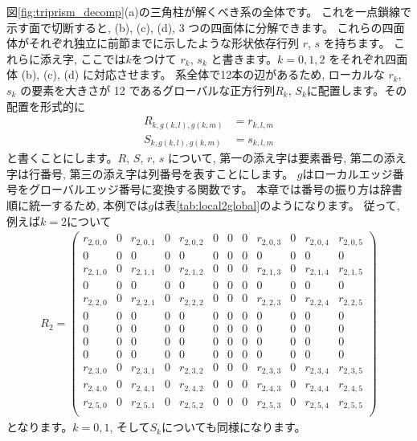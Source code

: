 図\ref{fig:triprism_decomp}(a)の三角柱が解くべき系の全体です。
これを一点鎖線で示す面で切断すると, (b), (c), (d), 3 つの四面体に分解できます。
これらの四面体がそれぞれ独立に前節までに示したような形状依存行列 $r$, $s$
を持ちます。
これらに添え字, ここでは$k$をつけて $r_k$, $s_k$
と書きます。$k=0, 1, 2$ をそれぞれ四面体 (b), (c), (d) に対応させます。
系全体で12本の辺があるため, ローカルな $r_k$, $s_k$ の要素を大きさが 12
であるグローバルな正方行列$R_k$, $S_k$に配置します。その配置を形式的に
\begin{align}
R_{k,g(k, l),g(k, m)} &= r_{k,l,m}\\
S_{k,g(k, l),g(k, m)} &= s_{k,l,m}
\end{align}
と書くことにします。$R$, $S$, $r$, $s$
について, 第一の添え字は要素番号, 第二の添え字は行番号,
第三の添え字は列番号を表すことにします。
$g$はローカルエッジ番号をグローバルエッジ番号に変換する関数です。
本章では番号の振り方は辞書順に統一するため,
本例では$g$は表\ref{tab:local2global}のようになります。
従って, 例えば$k=2$について
\begin{align}
R_2=
\left(
\begin{array}{ccccc|ccccc|cc}
r_{2,0,0} & 0 & r_{2,0,1} & 0 & r_{2,0,2} & 0 & 0 & 0 & r_{2,0,3} & 0 & r_{2,0,4} & r_{2,0,5}\\
0 & 0 & 0 & 0 & 0 &  0 & 0 & 0 & 0 & 0 &  0 & 0 \\
r_{2,1,0} & 0 & r_{2,1,1} & 0 & r_{2,1,2} & 0 & 0 & 0 & r_{2,1,3} & 0 & r_{2,1,4} & r_{2,1,5}\\
0 & 0 & 0 & 0 & 0 &  0 & 0 & 0 & 0 & 0 &  0 & 0 \\
r_{2,2,0} & 0 & r_{2,2,1} & 0 & r_{2,2,2} & 0 & 0 & 0 & r_{2,2,3} & 0 & r_{2,2,4} & r_{2,2,5}\\
\hline
0 & 0 & 0 & 0 & 0 &  0 & 0 & 0 & 0 & 0 &  0 & 0 \\
0 & 0 & 0 & 0 & 0 &  0 & 0 & 0 & 0 & 0 &  0 & 0 \\
0 & 0 & 0 & 0 & 0 &  0 & 0 & 0 & 0 & 0 &  0 & 0 \\
0 & 0 & 0 & 0 & 0 &  0 & 0 & 0 & 0 & 0 &  0 & 0 \\
r_{2,3,0} & 0 & r_{2,3,1} & 0 & r_{2,3,2} & 0 & 0 & 0 & r_{2,3,3} & 0 & r_{2,3,4} & r_{2,3,5}\\
\hline
r_{2,4,0} & 0 & r_{2,4,1} & 0 & r_{2,4,2} & 0 & 0 & 0 & r_{2,4,3} & 0 & r_{2,4,4} & r_{2,4,5}\\
r_{2,5,0} & 0 & r_{2,5,1} & 0 & r_{2,5,2} & 0 & 0 & 0 & r_{2,5,3} & 0 & r_{2,5,4} & r_{2,5,5}\\
\end{array}
\right)
\end{align}
となります。$k=0, 1$, そして$S_k$についても同様になります。


